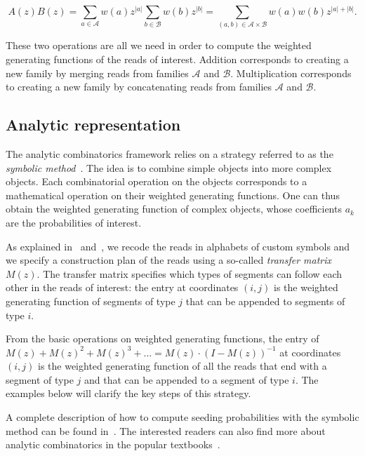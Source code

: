 \documentclass{article}
\begin{document}
\begin{equation*}
A(z)B(z) =
\sum_{a\in \mathcal{A}}w(a)z^{|a|} \sum_{b\in \mathcal{B}}w(b)z^{|b|}
= \sum_{(a,b) \in \mathcal{A} \times \mathcal{B}} w(a)w(b)z^{|a|+|b|}.
\end{equation*}

These two operations are all we need in order to compute the weighted
generating functions of the reads of interest. Addition corresponds to
creating a new family by merging reads from families $\mathcal{A}$ and
$\mathcal{B}$. Multiplication corresponds to creating a new family by
concatenating reads from families $\mathcal{A}$ and $\mathcal{B}$.

\subsection{Analytic representation}

The analytic combinatorics framework relies on a strategy referred to as
the \emph{symbolic method}~\cite{sedgewick2013introduction}. The idea is
to combine simple objects into more complex objects. Each combinatorial
operation on the objects corresponds to a mathematical operation on their
weighted generating functions. One can thus obtain the weighted generating
function of complex objects, whose coefficients $a_k$ are the
probabilities of interest.

As explained in~\cite{filion2017analytic} and~\cite{filion2018analytic},
we recode the reads in alphabets of custom symbols and we specify a
construction plan of the reads using a so-called \emph{transfer matrix}
$M(z)$. The transfer matrix specifies which types of segments can follow
each other in the reads of interest: the entry at coordinates $(i,j)$ is
the weighted generating function of segments of type $j$ that can be
appended to segments of type $i$.

From the basic operations on weighted generating functions, the entry of
$M(z) + M(z)^2 + M(z)^3 + \ldots = M(z) \cdot (I-M(z))^{-1}$ at
coordinates $(i,j)$ is the weighted generating function of all the reads
that end with a segment of type $j$ and that can be appended to a segment
of type $i$. The examples below will clarify the key steps of this
strategy.

A complete description of how to compute seeding probabilities with the
symbolic method can be found in~\cite{filion2017analytic,
filion2018analytic}. The interested readers can also find more about
analytic combinatorics in the popular
textbooks~\cite{flajolet2009analytic, sedgewick2013introduction}.
\end{document}
